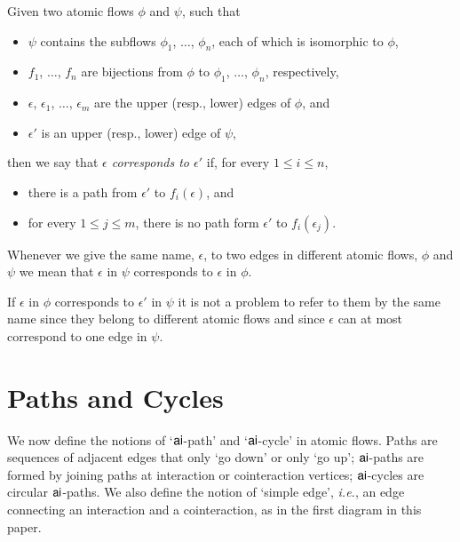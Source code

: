 

\begin{definition}
Given two atomic flows $\phi$ and $\psi$, such that
\begin{itemize}
  \item $\psi$ contains the subflows $\phi_1$, $\dots$, $\phi_n$, each of which is isomorphic to $\phi$,
  \item $f_1$, $\dots$, $f_n$ are bijections from $\phi$ to $\phi_1$, $\dots$, $\phi_n$, respectively,
  \item $\epsilon$, $\epsilon_1$, $\dots$, $\epsilon_m$ are the upper (resp., lower) edges of $\phi$, and
  \item $\epsilon'$ is an upper (resp., lower) edge of $\psi$,
\end{itemize}
then we say that \emph{$\epsilon$ corresponds to $\epsilon'$} if, for every $1\le i\le n$,
\begin{itemize}
  \item there is a path from $\epsilon'$ to $f_i(\epsilon)$, and
  \item for every $1\le j \le m$, there is no path form $\epsilon'$ to $f_i(\epsilon_j)$.
\end{itemize}
Whenever we give the same name, $\epsilon$, to two edges in different atomic flows, $\phi$ and $\psi$ we mean that $\epsilon$ in $\psi$ corresponds to $\epsilon$ in $\phi$.
\end{definition}

\begin{remark}
If $\epsilon$ in $\phi$ corresponds to $\epsilon'$ in $\psi$ it is not a problem to refer to them by the same name since they belong to different atomic flows and since $\epsilon$ can at most correspond to one edge in $\psi$.
\end{remark}


\section{Paths and Cycles}

We now define the notions of `$\mathsf{ai}$-path' and `$\mathsf{ai}$-cycle' in atomic flows. Paths are sequences of adjacent edges that only `go down' or only `go up'; $\mathsf{ai}$-paths are formed by joining paths at interaction or cointeraction vertices; $\mathsf{ai}$-cycles are circular $\mathsf{ai}$-paths. We also define the notion of `simple edge', \emph{i.e.}, an edge connecting an interaction and a cointeraction, as in the first diagram in this paper.

